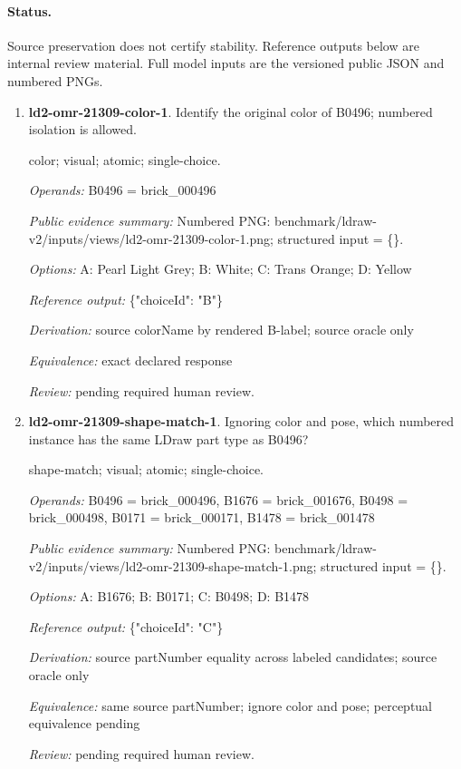 \paragraph{Status.}Source preservation does not certify stability. Reference outputs below are internal review material. Full model inputs are the versioned public JSON and numbered PNGs.
\begin{enumerate}
\item \textbf{ld2-omr-21309-color-1}. Identify the original color of B0496; numbered isolation is allowed.
\par{\small color; visual; atomic; single-choice.\par\textit{Operands:} B0496 = brick\_000496\par\textit{Public evidence summary:} Numbered PNG: benchmark/ldraw-v2/inputs/views/ld2-omr-21309-color-1.png; structured input = \{\}.\par\textit{Options:} A: Pearl Light Grey; B: White; C: Trans Orange; D: Yellow\par\textit{Reference output:} \{"choiceId": "B"\}\par\textit{Derivation:} source colorName by rendered B-label; source oracle only\par\textit{Equivalence:} exact declared response\par\textit{Review:} pending required human review.}
\item \textbf{ld2-omr-21309-shape-match-1}. Ignoring color and pose, which numbered instance has the same LDraw part type as B0496?
\par{\small shape-match; visual; atomic; single-choice.\par\textit{Operands:} B0496 = brick\_000496, B1676 = brick\_001676, B0498 = brick\_000498, B0171 = brick\_000171, B1478 = brick\_001478\par\textit{Public evidence summary:} Numbered PNG: benchmark/ldraw-v2/inputs/views/ld2-omr-21309-shape-match-1.png; structured input = \{\}.\par\textit{Options:} A: B1676; B: B0171; C: B0498; D: B1478\par\textit{Reference output:} \{"choiceId": "C"\}\par\textit{Derivation:} source partNumber equality across labeled candidates; source oracle only\par\textit{Equivalence:} same source partNumber; ignore color and pose; perceptual equivalence pending\par\textit{Review:} pending required human review.}

\end{enumerate}
